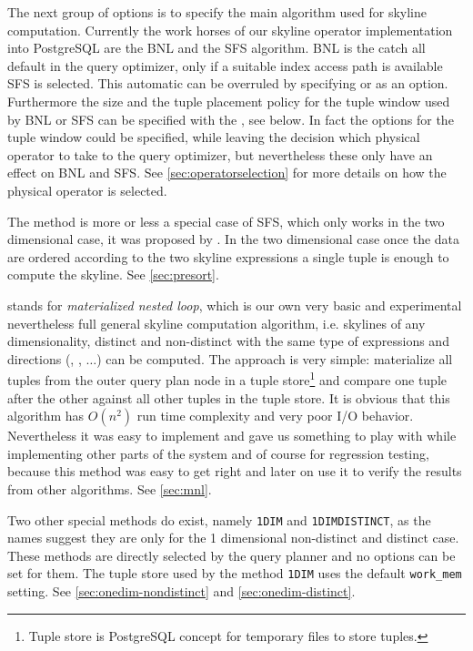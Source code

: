 The next group of options is to specify the main algorithm used for
skyline computation.
%
Currently the work horses of our skyline operator implementation into
PostgreSQL are the BNL and the SFS algorithm. 
BNL is the catch all default in the query optimizer, 
only if a suitable index access path
is available SFS is selected. 
This automatic can be overruled by
specifying  or  as an option. Furthermore
the size and the tuple placement policy for the tuple window used by
BNL or SFS can be specified with the , see below.
In fact the options for the tuple window could be specified, while
leaving the decision which physical operator to take to the query
optimizer, but nevertheless these  only have an
effect on BNL and SFS. See \autoref{sec:operatorselection} for
more details on how the physical operator is selected.


The  method is more or less a special case of SFS,
which only works in the two dimensional case, it was proposed by 
\citet{Borzsonyi2001}. In the two dimensional case once the data
are ordered according to the two skyline expressions a single tuple is
enough to compute the skyline. See \autoref{sec:presort}.

 stands for \emph{materialized nested loop}, which
is our own very basic and experimental nevertheless full general
skyline computation algorithm, i.e. skylines of any dimensionality,
distinct and non-distinct with the same type of expressions and
directions (, , $\ldots$) can be
computed. The approach is very simple: materialize all tuples from the
outer query plan node in a tuple store\footnote{Tuple store is PostgreSQL concept for temporary files
to store tuples.} and compare one tuple after the other against all
other tuples in the tuple store. It is obvious that this algorithm has
$O(n^2)$ run time complexity and very poor I/O behavior. Nevertheless
it was easy to implement and gave us something to play with while
implementing other parts of the system and of course for regression
testing, because this method was easy to get right and later on
use it to verify the results from other algorithms. See
\autoref{sec:mnl}.

Two other special methods do exist, namely \texttt{1DIM} and
\texttt{1DIMDISTINCT}, as the names suggest they are only for the 1
dimensional non-distinct and distinct case.  These methods are
directly selected by the query planner and no options can be set for
them.  The tuple store used by the method \texttt{1DIM} uses the
default \texttt{work\_mem} setting. See
\autoref{sec:onedim-nondistinct} and
\autoref{sec:onedim-distinct}.

